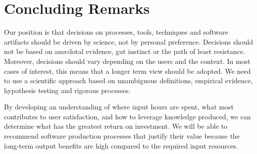 \documentclass[sigconf, authorversion, nonacm]{acmart}
\begin{document}

\section{Concluding Remarks}

Our position is that decisions on processes, tools, techniques and software
artifacts should be driven by science, not by personal preference.  Decisions
should not be based on anecdotal evidence, gut instinct or the path of least
resistance.  Moreover, decisions should vary depending on the users and the
context.  In most cases of interest, this means that a longer term view should
be adopted.  We need to use a scientific approach based on unambiguous
definitions, empirical evidence, hypothesis testing and rigorous processes.

By developing an understanding of where input hours are spent, what most
contributes to user satisfaction, and how to leverage knowledge produced,
we can determine what has the greatest return on investment.  We will be able
to recommend software production processes that justify their value because the
long-term output benefits are high compared to the required input resources.  




\end{document}
